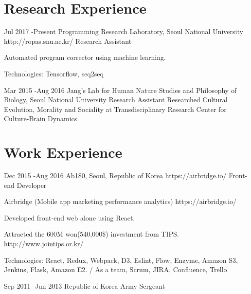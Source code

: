 \documentclass[10pt]{article} %
\begin{document}

\section{Research Experience}

\job
{Jul 2017 -}{Present}
{Programming Research Laboratory, Seoul National University}
{http://ropas.snu.ac.kr/}
{Research Assistant}
{Automated program corrector using machine learning.\\
\rule{0mm}{5mm}{Technologies:} Tensorflow, seq2seq}


\if{}
\job
{Mar 2015 -}{Aug 2016}
{Jang’s Lab for Human Nature Studies and Philosophy of Biology, Seoul National University}
{}
{Research Assistant}
{Researched Cultural Evolution, Morality and Sociality at Transdisciplinary Research Center for Culture-Brain Dynamics}
\fi


\section{Work Experience}

\job
{Dec 2015 -}{Aug 2016}
{Ab180, Seoul, Republic of Korea}
{https://airbridge.io/}
{Front-end Developer}
{Airbridge (Mobile app marketing performance analytics) https://airbridge.io/

Developed front-end web alone using React.

Attracted the 600M won(540,000\$) investment from TIPS. http://www.jointips.or.kr/\\
\rule{0mm}{5mm}{Technologies:} React, Redux, Webpack, D3, Eslint, Flow, Enzyme, Amazon S3, Jenkins, Flask, Amazon E2. / As a team, Scrum, JIRA, Confluence, Trello}


\if{}
\job
{Sep 2011 -}{Jun 2013}
{Republic of Korea Army}
{}
{Sergeant}
\fi
\end{document}
